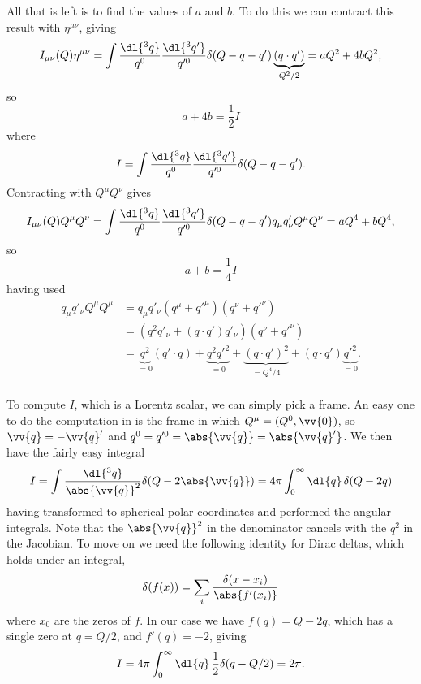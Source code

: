 \documentclass[fleqn]{NotesClass}
\newcommand{\minkowskiMetric}{\eta}
\begin{document}
    All that is left is to find the values of \(a\) and \(b\).
    To do this we can contract this result with \(\minkowskiMetric^{\mu\nu}\), giving
    \begin{equation}
        I_{\mu\nu}(Q)\minkowskiMetric^{\mu\nu} = \int \frac{\dl{^3q}}{q^0} \frac{\dl{^3q'}}{q'^0} \delta(Q - q - q') \underbrace{(q \cdot q')}_{Q^2/2} = aQ^2 + 4bQ^2,
    \end{equation}
    so
    \begin{equation}
        a + 4b = \frac{1}{2}I
    \end{equation}
    where
    \begin{equation}
        I = \int \frac{\dl{^3q}}{q^0} \frac{\dl{^3q'}}{q'^0} \delta(Q - q - q').
    \end{equation}
    Contracting  with \(Q^\mu Q^\nu\) gives
    \begin{equation}
        I_{\mu\nu}(Q)Q^\mu Q^\nu = \int \frac{\dl{^3q}}{q^0} \frac{\dl{^3q'}}{q'^0} \delta(Q - q - q') q_\mu q'_\nu Q^\mu Q^\nu = aQ^4 + bQ^4,
    \end{equation}
    so
    \begin{equation}
        a + b = \frac{1}{4}I
    \end{equation}
    having used
    \begin{align}
        q_\mu q'_\nu Q^\mu Q^\mu &= q_\mu q'_\nu (q^\mu + q'^\mu)(q^\nu + q'^\nu)\\
        &= (q^2q'_\nu + (q \cdot q')q'_\nu)(q^\nu + q'^\nu)\\
        &= \underbrace{q^2}_{=0}(q' \cdot q) + \underbrace{q^2q'^2}_{=0} + \underbrace{(q \cdot q')^2}_{=Q^4/4} + (q \cdot q')\underbrace{q'^2}_{=0}.\\
    \end{align}
    
    To compute \(I\), which is a Lorentz scalar, we can simply pick a frame.
    An easy one to do the computation in is the frame in which \(Q^\mu = (Q^0, \vv{0})\), so \(\vv{q} = -\vv{q}'\) and \(q^0 = q'^0 = \abs{\vv{q}} = \abs{\vv{q}'}\).
    We then have the fairly easy integral
    \begin{equation}
        I = \int \frac{\dl{^3q}}{\abs{\vv{q}}^2} \delta(Q - 2\abs{\vv{q}}) = 4\pi \int_0^\infty \dl{q} \, \delta(Q - 2q)
    \end{equation}
    having transformed to spherical polar coordinates and performed the angular integrals.
    Note that the \(\abs{\vv{q}}^2\) in the denominator cancels with the \(q^2\) in the Jacobian.
    To move on we need the following identity for Dirac deltas, which holds under an integral,
    \begin{equation}
        \delta(f(x)) = \sum_{i} \frac{\delta(x - x_i)}{\abs{f'(x_i)}}
    \end{equation}
    where \(x_0\) are the zeros of \(f\).
    In our case we have \(f(q) = Q - 2q\), which has a single zero at \(q = Q/2\), and \(f'(q) = -2\), giving
    \begin{equation}
        I = 4\pi \int_0^{\infty} \dl{q} \, \frac{1}{2} \delta(q - Q/2) = 2\pi.
    \end{equation}
    
\end{document}
